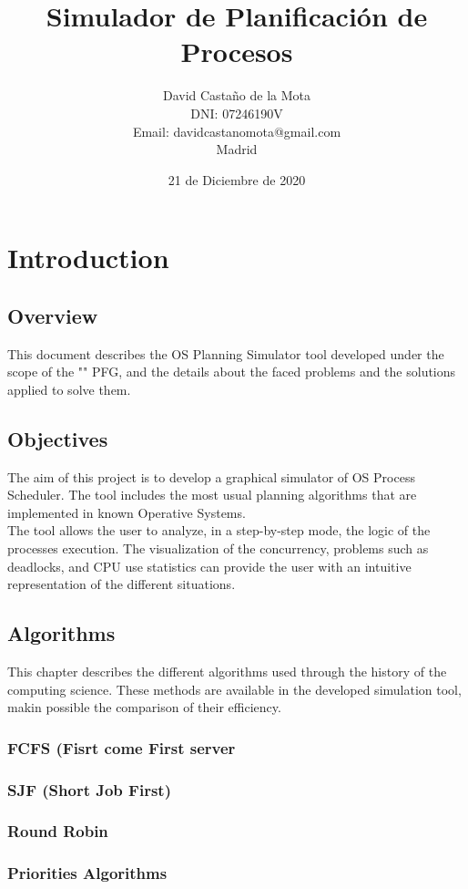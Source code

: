 \documentclass{report}
\title{\Huge Simulador de Planificación de Procesos}
\author{David Castaño de la Mota \\ DNI: 07246190V \\ Email: davidcastanomota@gmail.com\\Madrid}
\date{21 de Diciembre de 2020}
\begin{document}
\maketitle

\tableofcontents{}


\chapter{Introduction}
    \section{Overview}
        This document describes the OS Planning Simulator tool developed under the scope of the "" PFG, and the details about the faced problems and the solutions applied to solve them.
    \section{Objectives}
        The aim of this project is to develop a graphical simulator of OS Process Scheduler. The tool includes the most usual planning algorithms that are implemented in known Operative Systems.\\
        The tool allows the user to analyze, in a step-by-step mode, the logic of the processes execution. The visualization of the concurrency, problems such as deadlocks, and CPU use statistics can provide the user with an intuitive representation of the different situations.
    \section{Algorithms}
        This chapter describes the different algorithms used through the history of the computing science. These methods are available in the developed simulation tool, makin possible the comparison of their efficiency.
        \subsection{FCFS (Fisrt come First server}
        \subsection{SJF (Short Job First)}
        \subsection{Round Robin}
        \subsection{Priorities Algorithms}
\end{document}
